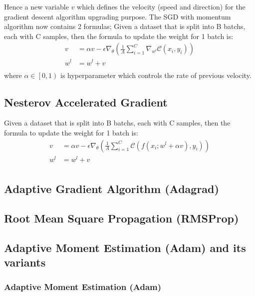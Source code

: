 Hence a new variable $v$ which defines the velocity (speed and direction) for the gradient descent algorithm upgrading purpose. The SGD with momentum algorithm now contains 2 formulas; Given a dataset that is split into B batchs, each with C samples, then the formula to update the weight for 1 batch is:
\begin{equation}
    \begin{aligned}
        v &= \alpha v - \epsilon \nabla_{\theta} \left( \frac{1}{A} \sum^{C}_{i=1} \nabla_{w^{l}} \mathcal{C}(x_{i},y_{i}) \right) \\
        w^{l} &= w^{l} + v\\
    \end{aligned}
\end{equation}
where $\alpha \in \left[0,1\right)$ is hyperparameter which controls the rate of previous velocity.
\subsection{Nesterov Accelerated Gradient}
Given a dataset that is split into B batchs, each with C samples, then the formula to update the weight for 1 batch is:
\begin{equation}
    \begin{aligned}
        v &= \alpha v - \epsilon \nabla_{\theta} \left( \frac{1}{A} \sum^{C}_{i=1} \mathcal{C}(f(x_{i};w^{l} + \alpha v),y_{i}) \right) \\
        w^{l} &= w^{l} + v\\
    \end{aligned}
\end{equation}
\subsection{Adaptive Gradient Algorithm (Adagrad)}

\subsection{Root Mean Square Propagation (RMSProp)}

\subsection{Adaptive Moment Estimation (Adam) and its variants}

\subsubsection{Adaptive Moment Estimation (Adam)}

